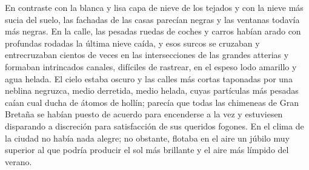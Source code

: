 \documentclass{novela}
\begin{document}
 En contraste con la blanca y lisa capa de nieve de los tejados y con la nieve más sucia del suelo, las fachadas de las casas parecían negras y las ventanas todavía más negras. En la calle, las pesadas ruedas de coches y carros habían arado con profundas rodadas la última nieve caída, y esos surcos se cruzaban y entrecruzaban cientos de veces en las intersecciones de las grandes atterias y formaban intrincados canales, difíciles de rastrear, en el espeso lodo amarillo y agua helada. El cielo estaba oscuro y las calles más cortas taponadas por una neblina negruzca, medio derretida, medio helada, cuyas partículas más pesadas caían cual ducha de átomos de hollín; parecía que todas las chimeneas de Gran Bretaña se habían puesto de acuerdo para encenderse a la vez y estuviesen disparando a discreción para satisfacción de sus queridos fogones. En el clima de la ciudad no había nada alegre; no obstante, flotaba en el aire un júbilo muy superior al que podría producir el sol más brillante y el aire más límpido del verano.
\end{document}
